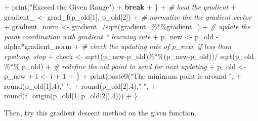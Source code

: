\documentclass[
]{article}
\newenvironment{Shaded}{\begin{snugshade}}{\end{snugshade}}
\newcommand{\CommentTok}[1]{\textcolor[rgb]{0.56,0.35,0.01}{\textit{#1}}}
\newcommand{\ControlFlowTok}[1]{\textcolor[rgb]{0.13,0.29,0.53}{\textbf{#1}}}
\newcommand{\DecValTok}[1]{\textcolor[rgb]{0.00,0.00,0.81}{#1}}
\newcommand{\FunctionTok}[1]{\textcolor[rgb]{0.00,0.00,0.00}{#1}}
\newcommand{\NormalTok}[1]{#1}
\newcommand{\OtherTok}[1]{\textcolor[rgb]{0.56,0.35,0.01}{#1}}
\newcommand{\SpecialCharTok}[1]{\textcolor[rgb]{0.00,0.00,0.00}{#1}}
\newcommand{\StringTok}[1]{\textcolor[rgb]{0.31,0.60,0.02}{#1}}
\begin{document}
\begin{Shaded}
\begin{Highlighting}[]
\SpecialCharTok{+}       \FunctionTok{print}\NormalTok{(}\StringTok{"Exceed the Given Range"}\NormalTok{)}
\SpecialCharTok{+}       \ControlFlowTok{break}
\SpecialCharTok{+}\NormalTok{       \}}
\SpecialCharTok{+}     \CommentTok{\# load the gradient}
\SpecialCharTok{+}\NormalTok{     gradient\_ }\OtherTok{\textless{}{-}} \FunctionTok{grad\_f}\NormalTok{(p\_old[}\DecValTok{1}\NormalTok{], p\_old[}\DecValTok{2}\NormalTok{])}
\SpecialCharTok{+}     \CommentTok{\# normalize the the gradient vector}
\SpecialCharTok{+}\NormalTok{     gradient\_norm }\OtherTok{\textless{}{-}}\NormalTok{ gradient\_}\SpecialCharTok{/}\FunctionTok{sqrt}\NormalTok{(gradient\_}\SpecialCharTok{\%*\%}\NormalTok{gradient\_)}
\SpecialCharTok{+}     \CommentTok{\# update the point coordination with gradient * learning rate}
\SpecialCharTok{+}\NormalTok{     p\_new }\OtherTok{\textless{}{-}}\NormalTok{ p\_old }\SpecialCharTok{{-}}\NormalTok{ alpha}\SpecialCharTok{*}\NormalTok{gradient\_norm}
\SpecialCharTok{+}     \CommentTok{\# check the updating rate of p\_new, if less than epsilong, stop}
\SpecialCharTok{+}\NormalTok{     check }\OtherTok{\textless{}{-}} \FunctionTok{sqrt}\NormalTok{((p\_new}\SpecialCharTok{{-}}\NormalTok{p\_old)}\SpecialCharTok{\%*\%}\NormalTok{(p\_new}\SpecialCharTok{{-}}\NormalTok{p\_old))}\SpecialCharTok{/} \FunctionTok{sqrt}\NormalTok{(p\_old }\SpecialCharTok{\%*\%}\NormalTok{ p\_old)}
\SpecialCharTok{+}     \CommentTok{\# redefine the old point to send for next updating }
\SpecialCharTok{+}\NormalTok{     p\_old }\OtherTok{\textless{}{-}}\NormalTok{ p\_new}
\SpecialCharTok{+}\NormalTok{     i }\OtherTok{\textless{}{-}}\NormalTok{ i }\SpecialCharTok{+} \DecValTok{1}
\SpecialCharTok{+}\NormalTok{   \}}
\SpecialCharTok{+}   \FunctionTok{print}\NormalTok{(}\FunctionTok{paste0}\NormalTok{(}\StringTok{"The minimum point is around "}\NormalTok{, }
\SpecialCharTok{+}                \FunctionTok{round}\NormalTok{(p\_old[}\DecValTok{1}\NormalTok{],}\DecValTok{4}\NormalTok{),}\StringTok{" "}\NormalTok{,}
\SpecialCharTok{+}                \FunctionTok{round}\NormalTok{(p\_old[}\DecValTok{2}\NormalTok{],}\DecValTok{4}\NormalTok{),}\StringTok{" "}\NormalTok{,}
\SpecialCharTok{+}                \FunctionTok{round}\NormalTok{(}\FunctionTok{f\_origin}\NormalTok{(p\_old[}\DecValTok{1}\NormalTok{],p\_old[}\DecValTok{2}\NormalTok{]),}\DecValTok{4}\NormalTok{)))}
\SpecialCharTok{+}\NormalTok{ \}}
\end{Highlighting}
\end{Shaded}

Then, try this gradient descent method on the given function.
\end{document}

